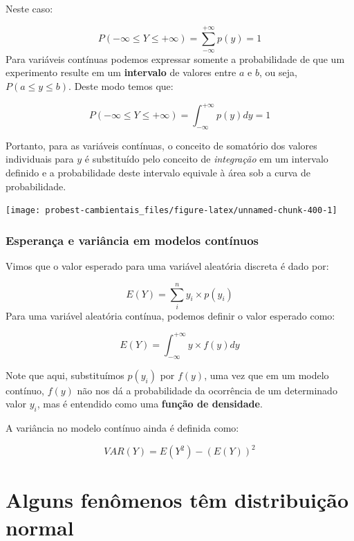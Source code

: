 \documentclass[
]{book}
\begin{document}
Neste caso:

\[P(-\infty \le Y \le +\infty) = \sum_{-\infty}^{+\infty} p(y) = 1\]
Para variáveis contínuas podemos expressar somente a probabilidade de que um experimento resulte em um \textbf{intervalo} de valores entre \(a\) e \(b\), ou seja, \(P(a \le y \le b)\). Deste modo temos que:

\[P(-\infty \le Y \le +\infty) = \int_{-\infty}^{+\infty}p(y) dy = 1\]

Portanto, para as variáveis contínuas, o conceito de somatório dos valores individuais para \(y\) é substituído pelo conceito de \emph{integração} em um intervalo definido e a probabilidade deste intervalo equivale à área sob a curva de probabilidade.

\begin{center}\texttt{[image: probest-cambientais\_files/figure-latex/unnamed-chunk-400-1]} \end{center}

\hypertarget{esperanuxe7a-e-variuxe2ncia-em-modelos-contuxednuos}{%
\subsubsection*{Esperança e variância em modelos contínuos}\label{esperanuxe7a-e-variuxe2ncia-em-modelos-contuxednuos}}

Vimos que o valor esperado para uma variável aleatória discreta é dado por:

\[E(Y) = \sum_i^n y_i \times p(y_i)\]
Para uma variável aleatória contínua, podemos definir o valor esperado como:

\[E(Y) = \int_{-\infty}^{+\infty}y \times f(y) dy\]

Note que aqui, substituímos \(p(y_i)\) por \(f(y)\), uma vez que em um modelo contínuo, \(f(y)\) não nos dá a probabilidade da ocorrência de um determinado valor \(y_i\), mas é entendido como uma \textbf{função de densidade}.

A variância no modelo contínuo ainda é definida como:

\[VAR(Y) = E(Y^2) - (E(Y))^2\]

\hypertarget{alguns-fenuxf4menos-tuxeam-distribuiuxe7uxe3o-normal}{%
\section{Alguns fenômenos têm distribuição normal}\label{alguns-fenuxf4menos-tuxeam-distribuiuxe7uxe3o-normal}}
\end{document}
